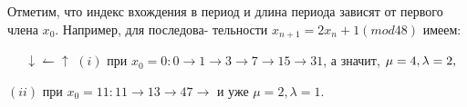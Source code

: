 \documentclass{../template/mai_book}
\begin{document}
\begin{mynotice}Отметим, что индекс вхождения в период и длина \linebreak \indent периода зависят от первого члена $x_{0}$. Например, для последова- \linebreak \indent тельности $x_{n+1} = 2x_{n} + 1 (mod 48)$ имеем: \linebreak
 
$\;\;\;\;\; \downarrow \leftharpoonup \uparrow$ \linebreak
\indent $(i)$ при $x_{0} = 0: 0 \to 1 \to 3 \to 7 \to 15 \to 31$, а значит, $\mu = 4, \linebreak \lambda = 2,$ \par 

$(ii)$ при $x_{0} = 11: 11 \to 13 \to 47 \to$ и уже $\mu = 2, \lambda = 1.$ \par 


\end{mynotice}
\end{document}
